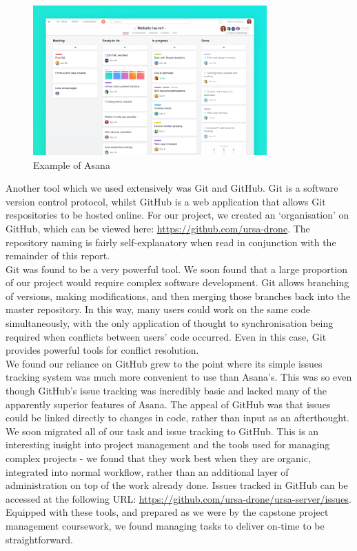 \documentclass[capstone_report.tex]{subfiles}
\begin{document}
    \begin{figure}[H]
	     \centering
	     \includegraphics[width=0.8\textwidth]{imgs/asanaBoard.png}
	     \caption{Example of Asana\label{fig:asana}}
	 \end{figure}

Another tool which we used extensively was Git and GitHub. Git is a software version control protocol, whilst GitHub is a web application that allows Git respositories to be hosted online. For our project, we created an `organisation' on GitHub, which can be viewed here: \url{https://github.com/ursa-drone}. The repository naming is fairly self-explanatory when read in conjunction with the remainder of this report. \\

Git was found to be a very powerful tool. We soon found that a large proportion of our project would require complex software development. Git allows branching of versions, making modifications, and then merging those branches back into the master repository. In this way, many users could work on the same code simultaneously, with the only application of thought to synchronisation being required when conflicts between users' code occurred. Even in this case, Git provides powerful tools for conflict resolution.\\

We found our reliance on GitHub grew to the point where its simple issues tracking system was much more convenient to use than Asana's. This was so even though GitHub's issue tracking was incredibly basic and lacked many of the apparently superior features of Asana. The appeal of GitHub was that issues could be linked directly to changes in code, rather than input as an afterthought. We soon migrated all of our task and issue tracking to GitHub. This is an interesting insight into project management and the tools used for managing complex projects - we found that they work best when they are organic, integrated into normal workflow, rather than an additional layer of administration on top of the work already done. Issues tracked in GitHub can be accessed at the following URL: \url{https://github.com/ursa-drone/ursa-server/issues}.\\

Equipped with these tools, and prepared as we were by the capstone project management coursework, we found managing tasks to deliver on-time to be straightforward.
\end{document}
